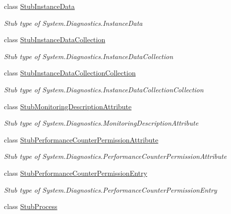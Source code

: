 \begin{DoxyCompactItemize}
class \hyperlink{class_system_1_1_diagnostics_1_1_fakes_1_1_stub_instance_data}{Stub\-Instance\-Data}
\begin{DoxyCompactList}\small\item\em Stub type of System.\-Diagnostics.\-Instance\-Data\end{DoxyCompactList}\item 
class \hyperlink{class_system_1_1_diagnostics_1_1_fakes_1_1_stub_instance_data_collection}{Stub\-Instance\-Data\-Collection}
\begin{DoxyCompactList}\small\item\em Stub type of System.\-Diagnostics.\-Instance\-Data\-Collection\end{DoxyCompactList}\item 
class \hyperlink{class_system_1_1_diagnostics_1_1_fakes_1_1_stub_instance_data_collection_collection}{Stub\-Instance\-Data\-Collection\-Collection}
\begin{DoxyCompactList}\small\item\em Stub type of System.\-Diagnostics.\-Instance\-Data\-Collection\-Collection\end{DoxyCompactList}\item 
class \hyperlink{class_system_1_1_diagnostics_1_1_fakes_1_1_stub_monitoring_description_attribute}{Stub\-Monitoring\-Description\-Attribute}
\begin{DoxyCompactList}\small\item\em Stub type of System.\-Diagnostics.\-Monitoring\-Description\-Attribute\end{DoxyCompactList}\item 
class \hyperlink{class_system_1_1_diagnostics_1_1_fakes_1_1_stub_performance_counter_permission_attribute}{Stub\-Performance\-Counter\-Permission\-Attribute}
\begin{DoxyCompactList}\small\item\em Stub type of System.\-Diagnostics.\-Performance\-Counter\-Permission\-Attribute\end{DoxyCompactList}\item 
class \hyperlink{class_system_1_1_diagnostics_1_1_fakes_1_1_stub_performance_counter_permission_entry}{Stub\-Performance\-Counter\-Permission\-Entry}
\begin{DoxyCompactList}\small\item\em Stub type of System.\-Diagnostics.\-Performance\-Counter\-Permission\-Entry\end{DoxyCompactList}\item 
class \hyperlink{class_system_1_1_diagnostics_1_1_fakes_1_1_stub_process}{Stub\-Process}

\end{DoxyCompactItemize}
